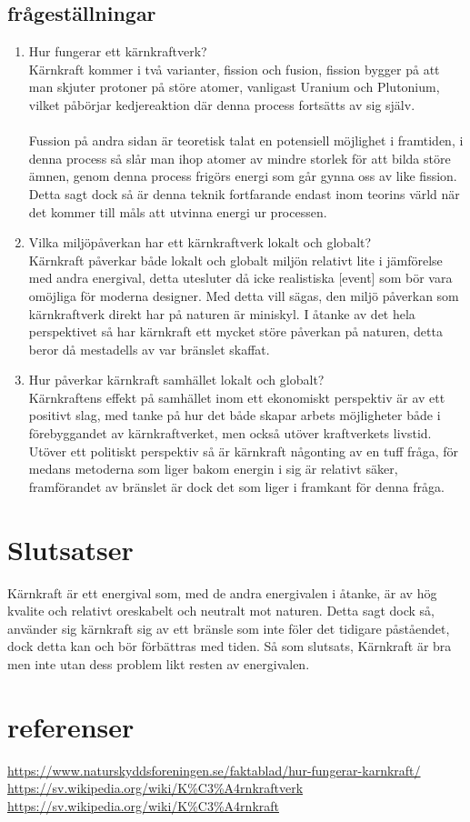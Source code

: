 \documentclass[11pt]{article}
\begin{document}
    \subsection{frågeställningar}
    \begin{enumerate}
        \item Hur fungerar ett kärnkraftverk?\\
        Kärnkraft kommer i två varianter, fission och fusion, fission bygger på att man skjuter protoner på störe atomer, vanligast Uranium och Plutonium, vilket påbörjar kedjereaktion där denna process fortsätts av sig själv.\\
        \\
        Fussion på andra sidan är teoretisk talat en potensiell möjlighet i framtiden, i denna process så slår man ihop atomer av mindre storlek för att bilda störe ämnen, genom denna process frigörs energi som går gynna oss av like fission. Detta sagt dock så är denna teknik fortfarande endast inom teorins värld när det kommer till måls att utvinna energi ur processen.
        \item Vilka miljöpåverkan har ett kärnkraftverk lokalt och globalt?\\
        Kärnkraft påverkar både lokalt och globalt miljön relativt lite i jämförelse med andra energival, detta utesluter då icke realistiska [event] som bör vara omöjliga för moderna designer. Med detta vill sägas, den miljö påverkan som kärnkraftverk direkt har på naturen är miniskyl. I åtanke av det hela perspektivet så har kärnkraft ett mycket störe påverkan på naturen, detta beror då mestadells av var bränslet skaffat.
        \item Hur påverkar kärnkraft samhället lokalt och globalt?\\
        Kärnkraftens effekt på samhället inom ett ekonomiskt perspektiv är av ett positivt slag, med tanke på hur det både skapar arbets möjligheter både i förebyggandet av kärnkraftverket, men också utöver kraftverkets livstid. Utöver ett politiskt perspektiv så är kärnkraft någonting av en tuff fråga, för medans metoderna som liger bakom energin i sig är relativt säker, framförandet av bränslet är dock det som liger i framkant för denna fråga.
    \end{enumerate}

    \section{Slutsatser}
    Kärnkraft är ett energival som, med de andra energivalen i åtanke, är av hög kvalite och relativt oreskabelt och neutralt mot naturen. Detta sagt dock så, använder sig kärnkraft sig av ett bränsle som inte föler det tidigare påståendet, dock detta kan och bör förbättras med tiden. Så som slutsats, Kärnkraft är bra men inte utan dess problem likt resten av energivalen.

    \section{referenser}
    \url{https://www.naturskyddsforeningen.se/faktablad/hur-fungerar-karnkraft/} \\
    \url{https://sv.wikipedia.org/wiki/K%C3%A4rnkraftverk} \\
    \url{https://sv.wikipedia.org/wiki/K%C3%A4rnkraft} \\
\end{document}
